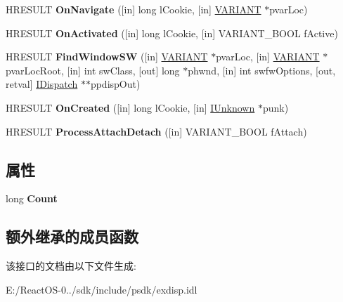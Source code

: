 \begin{DoxyCompactItemize}
H\+R\+E\+S\+U\+LT {\bfseries On\+Navigate} (\mbox{[}in\mbox{]} long l\+Cookie, \mbox{[}in\mbox{]} \hyperlink{structtag_v_a_r_i_a_n_t}{V\+A\+R\+I\+A\+NT} $\ast$pvar\+Loc)
\item 
\mbox{\label{interface_s_h_doc_vw_1_1_i_shell_windows_a3525689723a2b3c07eee7706c417809d}} 
H\+R\+E\+S\+U\+LT {\bfseries On\+Activated} (\mbox{[}in\mbox{]} long l\+Cookie, \mbox{[}in\mbox{]} V\+A\+R\+I\+A\+N\+T\+\_\+\+B\+O\+OL f\+Active)
\item 
\mbox{\label{interface_s_h_doc_vw_1_1_i_shell_windows_a33b5e12111bd9a78f65b2e076d57d38a}} 
H\+R\+E\+S\+U\+LT {\bfseries Find\+Window\+SW} (\mbox{[}in\mbox{]} \hyperlink{structtag_v_a_r_i_a_n_t}{V\+A\+R\+I\+A\+NT} $\ast$pvar\+Loc, \mbox{[}in\mbox{]} \hyperlink{structtag_v_a_r_i_a_n_t}{V\+A\+R\+I\+A\+NT} $\ast$pvar\+Loc\+Root, \mbox{[}in\mbox{]} int sw\+Class, \mbox{[}out\mbox{]} long $\ast$phwnd, \mbox{[}in\mbox{]} int swfw\+Options, \mbox{[}out, retval\mbox{]} \hyperlink{interface_i_dispatch}{I\+Dispatch} $\ast$$\ast$ppdisp\+Out)
\item 
\mbox{\label{interface_s_h_doc_vw_1_1_i_shell_windows_ad7e27e537355b8cafc9804463eff46f4}} 
H\+R\+E\+S\+U\+LT {\bfseries On\+Created} (\mbox{[}in\mbox{]} long l\+Cookie, \mbox{[}in\mbox{]} \hyperlink{interface_i_unknown}{I\+Unknown} $\ast$punk)
\item 
\mbox{\label{interface_s_h_doc_vw_1_1_i_shell_windows_acbbe50ede94cc20d69e89ae385f6bf62}} 
H\+R\+E\+S\+U\+LT {\bfseries Process\+Attach\+Detach} (\mbox{[}in\mbox{]} V\+A\+R\+I\+A\+N\+T\+\_\+\+B\+O\+OL f\+Attach)
\end{DoxyCompactItemize}
\subsection*{属性}
\begin{DoxyCompactItemize}
\item 
\mbox{\label{interface_s_h_doc_vw_1_1_i_shell_windows_a20c5174595f510ea26a1eb7340353126}} 
long {\bfseries Count}
\end{DoxyCompactItemize}
\subsection*{额外继承的成员函数}


该接口的文档由以下文件生成\+:\begin{DoxyCompactItemize}
\item 
E\+:/\+React\+O\+S-\/0../sdk/include/psdk/exdisp.\+idl\end{DoxyCompactItemize}
